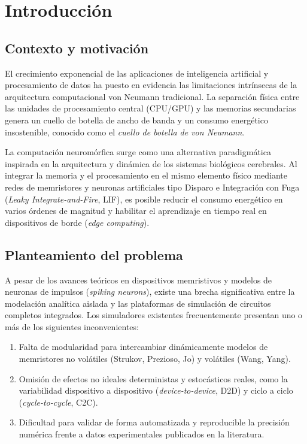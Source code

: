 
\chapter{Introducción}
\label{ch:introduccion}

\section{Contexto y motivación}
\label{sec:intro-contexto}

El crecimiento exponencial de las aplicaciones de inteligencia artificial y procesamiento de datos ha puesto en evidencia las limitaciones intrínsecas de la arquitectura computacional von Neumann tradicional. La separación física entre las unidades de procesamiento central (CPU/GPU) y las memorias secundarias genera un cuello de botella de ancho de banda y un consumo energético insostenible, conocido como el \emph{cuello de botella de von Neumann}.

La computación neuromórfica surge como una alternativa paradigmática inspirada en la arquitectura y dinámica de los sistemas biológicos cerebrales. Al integrar la memoria y el procesamiento en el mismo elemento físico mediante redes de memristores y neuronas artificiales tipo Disparo e Integración con Fuga (\emph{Leaky Integrate-and-Fire}, LIF), es posible reducir el consumo energético en varios órdenes de magnitud y habilitar el aprendizaje en tiempo real en dispositivos de borde (\emph{edge computing}).

\section{Planteamiento del problema}
\label{sec:intro-problema}

A pesar de los avances teóricos en dispositivos memristivos y modelos de neuronas de impulsos (\emph{spiking neurons}), existe una brecha significativa entre la modelación analítica aislada y las plataformas de simulación de circuitos completos integrados. Los simuladores existentes frecuentemente presentan uno o más de los siguientes inconvenientes:
\begin{enumerate}
    \item Falta de modularidad para intercambiar dinámicamente modelos de memristores no volátiles (Strukov, Prezioso, Jo) y volátiles (Wang, Yang).
    \item Omisión de efectos no ideales deterministas y estocásticos reales, como la variabilidad dispositivo a dispositivo (\emph{device-to-device}, D2D) y ciclo a ciclo (\emph{cycle-to-cycle}, C2C).
    \item Dificultad para validar de forma automatizada y reproducible la precisión numérica frente a datos experimentales publicados en la literatura.
\end{enumerate}

